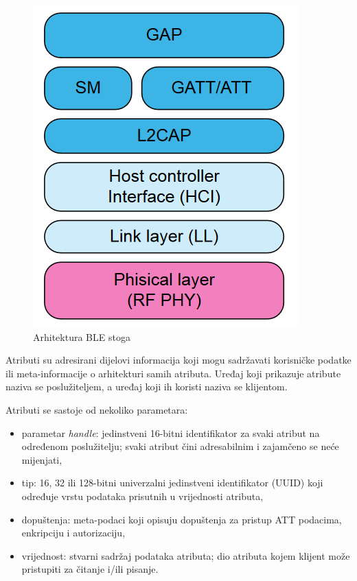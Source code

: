 \begin{figure}[ht]
		\centering
		\includegraphics[scale=0.5]{imgs/ble_stack_arch}
		\caption{Arhitektura BLE stoga \cite{blemanual}}
		\label{fig:ble-stack-arch}
\end{figure}

Atributi su adresirani dijelovi informacija koji mogu sadržavati korisničke podatke ili meta-informacije o arhitekturi samih atributa. Uređaj koji prikazuje atribute naziva se poslužiteljem, a uređaj koji ih koristi naziva se klijentom. 

Atributi se sastoje od nekoliko parametara:
\begin{itemize}
	\item parametar \textit{handle}: jedinstveni 16-bitni identifikator za svaki atribut na određenom poslužitelju; svaki atribut čini adresabilnim i zajamčeno se neće mijenjati,
	\item tip: 16, 32 ili 128-bitni univerzalni jedinstveni identifikator (UUID) koji određuje vrstu podataka prisutnih u vrijednosti atributa,
	\item dopuštenja: meta-podaci koji opisuju dopuštenja za pristup ATT podacima, enkripciju i autorizaciju,
	\item vrijednost: stvarni sadržaj podataka atributa; dio atributa kojem klijent može pristupiti za čitanje i/ili pisanje.
\end{itemize}


